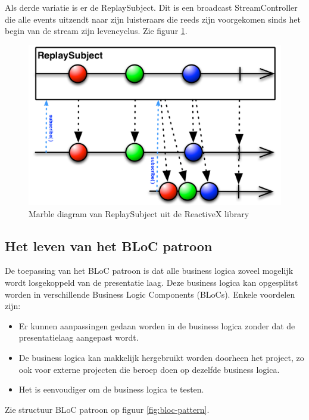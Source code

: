 Als derde variatie is er de ReplaySubject. Dit is een broadcast StreamController die alle events uitzendt naar zijn luisteraars die reeds zijn voorgekomen sinds het begin van de stream zijn levencyclus. Zie figuur \ref{fig:rxdart-replaysubject}.

\begin{figure}[H]
    \centering
    \includegraphics[width=\figureWidthModifier\linewidth]{img/stand-van-zaken/rxdart-replaysubject.png}
    \caption{Marble diagram van ReplaySubject uit de ReactiveX library\autocite{Boelens2018}}
    \label{fig:rxdart-replaysubject}
\end{figure}

\subsection*{Het leven van het BLoC patroon}
De toepassing van het BLoC patroon is dat alle business logica zoveel mogelijk wordt losgekoppeld van de presentatie laag. Deze business logica kan opgesplitst worden in verschillende Business Logic Components (BLoCs). 
\newline
Enkele voordelen zijn: 
\begin{itemize}
    \item Er kunnen aanpassingen gedaan worden in de business logica zonder dat de presentatielaag aangepast wordt.
    \item De business logica kan makkelijk hergebruikt worden doorheen het project, zo ook voor externe projecten die beroep doen op dezelfde business logica.
    \item Het is eenvoudiger om de business logica te testen.
\end{itemize}
Zie structuur BLoC patroon op figuur \ref{fig:bloc-pattern}.

